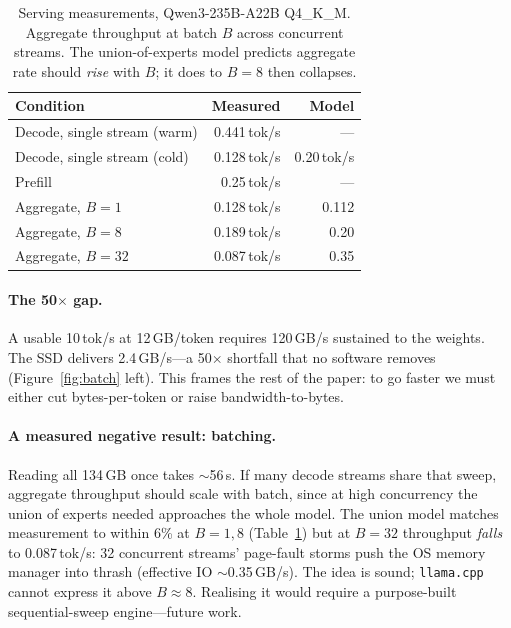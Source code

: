 \documentclass[11pt]{article}
\newcommand{\tps}{tok/s}
\begin{document}
\begin{table}[t]\centering
\caption{Serving measurements, Qwen3-235B-A22B Q4\_K\_M. Aggregate throughput at
batch $B$ across concurrent streams. The union-of-experts model predicts
aggregate rate should \emph{rise} with $B$; it does to $B{=}8$ then collapses.}
\label{tab:serve}
\small
\begin{tabular}{lrr}
\toprule
Condition & Measured & Model \\
\midrule
Decode, single stream (warm) & 0.441\,\tps{} & --- \\
Decode, single stream (cold) & 0.128\,\tps{} & 0.20\,\tps{} \\
Prefill & 0.25\,\tps{} & --- \\
Aggregate, $B{=}1$ & 0.128\,\tps{} & 0.112 \\
Aggregate, $B{=}8$ & 0.189\,\tps{} & 0.20 \\
Aggregate, $B{=}32$ & \textcolor{wall}{0.087}\,\tps{} & 0.35 \\
\bottomrule
\end{tabular}
\end{table}

\paragraph{The 50$\times$ gap.}
A usable 10\,\tps{} at 12\,GB/token requires 120\,GB/s sustained to the weights.
The SSD delivers 2.4\,GB/s---a 50$\times$ shortfall that no software removes
(Figure~\ref{fig:batch} left). This frames the rest of the paper: to go faster
we must either cut bytes-per-token or raise bandwidth-to-bytes.

\paragraph{A measured negative result: batching.}
Reading all 134\,GB once takes $\sim$56\,s. If many decode streams share that
sweep, aggregate throughput should scale with batch, since at high concurrency
the union of experts needed approaches the whole model. The union model matches
measurement to within 6\% at $B{=}1,8$ (Table~\ref{tab:serve}) but at $B{=}32$
throughput \emph{falls} to 0.087\,\tps: 32 concurrent streams' page-fault storms
push the OS memory manager into thrash (effective IO $\sim$0.35\,GB/s). The idea
is sound; \texttt{llama.cpp} cannot express it above $B\!\approx\!8$. Realising
it would require a purpose-built sequential-sweep engine---future work.
\end{document}
